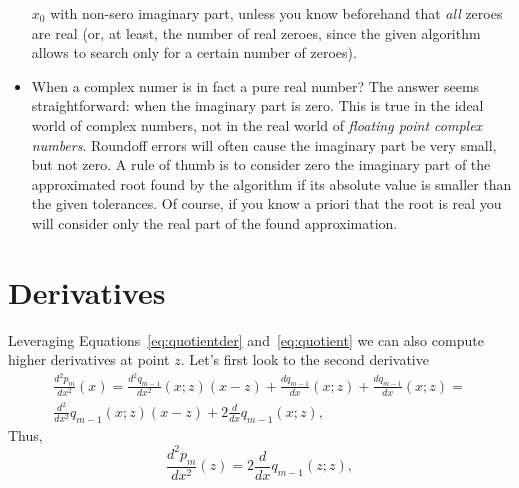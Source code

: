 \documentclass[10pt,a4paper]{article}
\theoremstyle{definition}%
\begin{document}
\begin{itemize}
    $x_0$ with non-sero imaginary part, unless you know beforehand that \emph{all} zeroes are real (or, at least, the number of real zeroes, since the given algorithm allows to search only for a certain number of zeroes).
    \item When a complex numer is in fact a pure real number? The answer seems straightforward: when the imaginary part is zero. This is true in the ideal world of complex numbers, not in the real world of \emph{floating point complex numbers}. Roundoff errors
    will often cause the imaginary part be very small, but not zero.  A rule of thumb is to consider zero the imaginary part of the
    approximated root found by the algorithm if its absolute value is smaller than the given tolerances. Of course, if you know a priori that the root is real you will consider only the real part of the found approximation.
\end{itemize}


\section{Derivatives}
Leveraging Equations~\eqref{eq:quotientder} and~\eqref{eq:quotient} we can also compute higher derivatives at point $z$. Let's first look to the second derivative
\begin{multline}\label{eq:secderexp}
\frac{d^2p_m}{dx^2}(x)=\frac{d^2q_{m-1}}{dx^2}(x;z)(x-z) + \frac{dq_{m-1}}{dx} (x;z) + \frac{dq_{m-1}}{dx} (x;z)=\\ \frac{d^2}{dx^2}q_{m-1}(x;z)(x-z) + 2 \frac{d}{dx} q_{m-1}(x;z),
\end{multline}
Thus,
\begin{equation}\label{eq:secder}
\frac{d^2p_m}{dx^2}(z)=2 \frac{d}{dx} q_{m-1}(z;z),
\end{equation}
\end{document}
